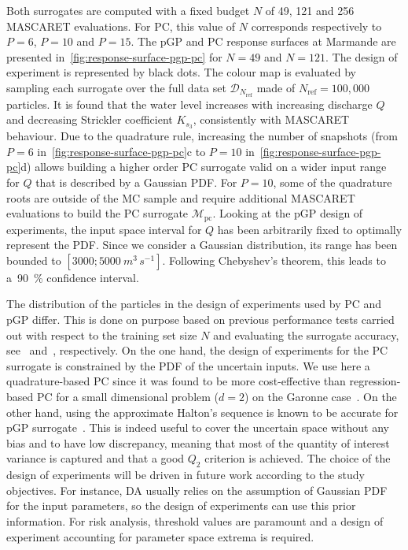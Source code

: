 Both surrogates are computed with a fixed budget $N$ of 49, 121 and 256 MASCARET evaluations. For PC, this value of $N$ corresponds respectively to $P = 6$, $P = 10$ and $P = 15$. The pGP and PC response surfaces at Marmande are presented in~\cref{fig:response-surface-pgp-pc} for $N = 49$ and $N = 121$. The design of experiment is represented by black dots. The colour map is evaluated by sampling each surrogate over the full data set $\mathcal{D}_{N_{\text{ref}}}$ made of $N_{\text{ref}} = 100,000$ particles. It is found that the water level increases with increasing discharge $Q$ and decreasing Strickler coefficient $K_{s_3}$, consistently with MASCARET behaviour. Due to the quadrature rule, increasing the number of snapshots (from $P = 6$ in~\cref{fig:response-surface-pgp-pc}c to $P = 10$ in~\cref{fig:response-surface-pgp-pc}d) allows building a higher order PC surrogate valid on a wider input range for $Q$ that is described by a Gaussian PDF. For $P = 10$, some of the quadrature roots are outside of the MC sample and require additional MASCARET evaluations to build the PC surrogate $\mathcal{M}_{\text{pc}}$. Looking at the pGP design of experiments, the input space interval for $Q$ has been arbitrarily fixed to optimally represent the PDF. Since we consider a Gaussian distribution, its range has been bounded to $[3000;5000~\unit{m^3\,s^{-1}}]$. Following Chebyshev's theorem, this leads to a~90~\% confidence interval.

The distribution of the particles in the design of experiments used by PC and pGP differ. This is done on purpose based on previous performance tests carried out with respect to the training set size $N$ and evaluating the surrogate accuracy, see~\cite{elmocaydEMA} and~\cite{roy2016}, respectively. On the one hand, the design of experiments for the PC surrogate is constrained by the PDF of the uncertain inputs. We use here a quadrature-based PC since it was found to be more cost-effective than regression-based PC for a small dimensional problem ($d = 2$) on the Garonne case~\citep{elmocaydEMA}. On the other hand, using the approximate Halton's sequence is known to be accurate for pGP surrogate~\citep{Damblin2013}. This is indeed useful to cover the uncertain space without any bias and to have low discrepancy, meaning that most of the quantity of interest variance is captured and that a good $Q_2$ criterion is achieved. The choice of the design of experiments will be driven in future work according to the study objectives. For instance, DA usually relies on the assumption of Gaussian PDF for the input parameters, so the design of experiments can use this prior information. For risk analysis, threshold values are paramount and a design of experiment accounting for parameter space extrema is required.

